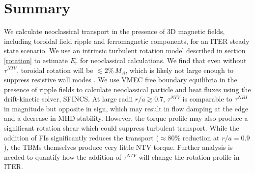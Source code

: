 \documentclass{article}
\numberwithin{figure}{section}
\numberwithin{equation}{section}
\begin{document}
\FloatBarrier

\section{Summary}\label{summary}

We calculate neoclassical transport in the presence of 3D magnetic fields, including toroidal field ripple and ferromagnetic components, for an ITER steady state scenario. We use an intrinsic turbulent rotation model described in section \ref{rotation} to estimate $E_r$ for neoclassical calculations. We find that even without $\tau^{NTV}$, toroidal rotation will be $\lesssim 2\% \,M_A$, which is likely not large enough to suppress resistive wall modes \cite{Liu2004}. We use VMEC free boundary equilibria in the presence of ripple fields to calculate neoclassical particle and heat fluxes using the drift-kinetic solver, SFINCS. At large radii $r/a \gtrsim 0.7$, $\tau^{NTV}$ is comparable to $\tau^{NBI}$ in magnitude but opposite in sign, which may result in flow damping at the edge and a decrease in MHD stability. However, the torque profile may also produce a significant rotation shear which could suppress turbulent transport. While the addition of FIs significantly reduces the transport ($\approx 80\%$ reduction at $r/a = 0.9$), the TBMs themselves produce very little NTV torque. Further analysis is needed to quantify how the addition of $\tau^{NTV}$ will change the rotation profile in ITER. 

\appendix
\end{document}
